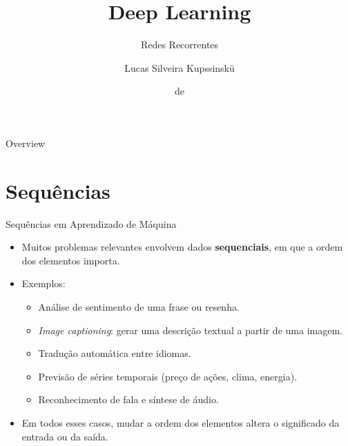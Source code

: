 \documentclass[aspectratio=169,xcolor=dvipsnames]{beamer}
\title{Deep Learning}
\subtitle{Redes Recorrentes}
\author{Lucas Silveira Kupssinskü}
\institute
{
    Machine Learning Theory and Applications Laboratory \\
    PUCRS
}
\date{\mespor de \the\year}
\begin{document}
\begin{frame}
    \titlepage
\end{frame}

\begin{frame}{Overview}
    \tableofcontents
\end{frame}

\section{Sequências}

\begin{frame}{Sequências em Aprendizado de Máquina}
\begin{itemize}
    \item Muitos problemas relevantes envolvem dados \textbf{sequenciais}, em que a ordem dos elementos importa.
    \item Exemplos:
    \begin{itemize}
        \item Análise de sentimento de uma frase ou resenha.
        \item \textit{Image captioning}: gerar uma descrição textual a partir de uma imagem.
        \item Tradução automática entre idiomas.
        \item Previsão de séries temporais (preço de ações, clima, energia).
        \item Reconhecimento de fala e síntese de áudio.
    \end{itemize}
    \item Em todos esses casos, mudar a ordem dos elementos altera o significado da entrada ou da saída.
\end{itemize}
\end{frame}
\end{document}
